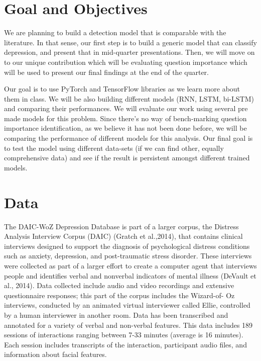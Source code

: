 \section{Goal and Objectives}

We are planning to build a detection model that is comparable with the literature. In that sense, our first step is to build a generic model that can classify depression, and present that in mid-quarter presentations. Then, we will move on to our unique contribution which will be evaluating question importance which will be used to present our final findings at the end of the quarter.

Our goal is to use PyTorch and TensorFlow libraries as we learn more about them in class. We will be also building different models (RNN, LSTM, bi-LSTM) and comparing their performances. We will evaluate our work using several pre made models for this problem. Since there's no way of bench-marking question importance identification, as we believe it has not been done before, we will be comparing the performance of different models for this analysis. Our final goal is to test the model using different data-sets (if we can find other, equally comprehensive data) and see if the result is persistent amongst different trained models.

\section{Data}

The DAIC-WoZ Depression Database is part of a larger corpus, the Distress Analysis Interview Corpus (DAIC) (Gratch et al.,2014), that contains clinical interviews designed to support the diagnosis of psychological distress conditions such as anxiety, depression, and post-traumatic stress disorder. These interviews were collected as part of a larger effort to create a computer agent that interviews people and identifies verbal and nonverbal indicators of mental illness (DeVault et al., 2014). Data collected include audio and video recordings and extensive questionnaire responses; this part of the corpus includes the Wizard-of- Oz interviews, conducted by an animated virtual interviewer called Ellie, controlled by a human interviewer in another room. Data has been transcribed and annotated for a variety of verbal and non-verbal features. This data includes 189 sessions of interactions ranging between 7-33 minutes (average is 16 minutes). Each session includes transcripts of the interaction, participant audio files, and information about facial features.



